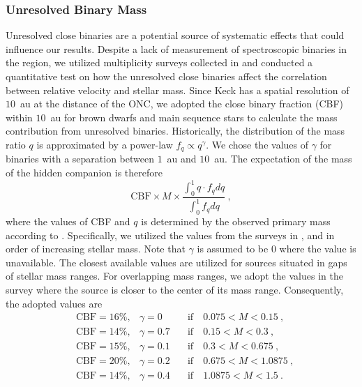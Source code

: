 \documentclass[12pt]{ucsddissertation}
\begin{document}
\begin{CJK*}{UTF8}{gbsn}
\subsubsection{Unresolved Binary Mass}
Unresolved close binaries are a potential source of systematic effects that could influence our results. Despite a lack of measurement of spectroscopic binaries in the region, we utilized multiplicity surveys collected in \citet{Offner-2023} and conducted a quantitative test on how the unresolved close binaries affect the correlation between relative velocity and stellar mass. Since Keck has a spatial resolution of $10$~au at the distance of the ONC, we adopted the close binary fraction (CBF) within $10$~au for brown dwarfs and main sequence stars to calculate the mass contribution from unresolved binaries. Historically, the distribution of the mass ratio $q$ is approximated by a power-law $f_q\propto q^\gamma$. We chose the values of $\gamma$ for binaries with a separation between $1$~au and $10$~au. The expectation of the mass of the hidden companion is therefore
\begin{equation}
    \mathrm{CBF}\times M\times\frac{\int_0^1 q\cdot f_q dq}{\int_0^1 f_q dq}~,
    \label{eq:binary mass}
\end{equation}
where the values of CBF and $q$ is determined by the observed primary mass according to \citet{Offner-2023}. Specifically, we utilized the values from the surveys in \citet{Winters-2019, Raghavan-2010}, and \citet{Tokovinin-2014} in order of increasing stellar mass. Note that $\gamma$ is assumed to be $0$ where the value is unavailable. The closest available values are utilized for sources situated in gaps of stellar mass ranges. For overlapping mass ranges, we adopt the values in the survey where the source is closer to the center of its mass range. Consequently, the adopted values are
\begin{equation}
\begin{aligned}
    &\mathrm{CBF}=16\%,&\gamma=0\quad&\mathrm{if}\quad0.075<M<0.15~,\\
    &\mathrm{CBF}=14\%,&\gamma=0.7\quad&\mathrm{if}\quad0.15<M<0.3~,\\
    &\mathrm{CBF}=15\%,&\gamma=0.1\quad&\mathrm{if}\quad0.3<M<0.675~,\\
    &\mathrm{CBF}=20\%,&\gamma=0.2\quad&\mathrm{if}\quad0.675<M<1.0875~,\\
    &\mathrm{CBF}=14\%,&\gamma=0.4\quad&\mathrm{if}\quad1.0875<M<1.5~.
\end{aligned}
\end{equation}

\end{CJK*}
\end{document}
